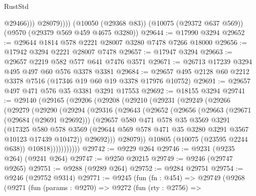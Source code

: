 \begin{lexlean}{RustStd}
\begin{coremodule}
                  @29466)))
            @28079))))
    (@10050 (@29368 @83))
    (@10075 (@29372 @637 @569))
    (@9570 (@29379 @569 @459 @4675 @3280))
@29644 := @17990 @3294
@29652 := @29644 @1814 @578 @2221 @28007 @3280 @7478 @7266 @18000
@29656 := @17942 @3294 @2221 @28007 @7478
@29657 := @17947 @3294
@29663 := @29657 @2219 @582 @577 @641 @7476 @3571
@29671 := @26713 @17239 @3294 @495 @497 @60 @576 @3378 @3381
@29684 := @29657 @495 @2128 @60 @2212 @3378 @7516 (@17346 @19 @60 @19 @3378 @17976 @10752)
@29691 := @29657 @497 @471 @576 @35 @3381 @3291 @17553
@29692 := @18155 @3294
@29741 := @29140
    (@29165
      (@29206
        (@29208
          (@29210
            (@29231
              (@29249
                (@29266
                  (@29279
                    (@29290
                      (@29294
                        (@29316
                          (@29643
                            (@29652
                              (@29656
                                (@29663
                                  (@29671 (@29684 (@29691 @29692)))
                                  (@29657
                                    @580
                                    @471
                                    @578
                                    @35
                                    @3569
                                    @3291
                                    (@17325
                                      @580
                                      @578
                                      @3569
                                      (@29644
                                        @569
                                        @578
                                        @471
                                        @35
                                        @3280
                                        @3291
                                        @3567
                                        @10123
                                        @17439
                                        @10472))
                                    @29692)))
                              @28079))
                          @10805
                          (@10075 (@23595 @2244 @638))
                          @10818)))))))))))
@29742 := @9229 @264
@29746 := @9231 (@9235 @264) (@9241 @264)
@29747 := @9250 @20215
@29749 := @9246 (@29747 @9265)
@29751 := @9288 (@9289 @264)
@29752 := @9284 @29751
@29754 := @9246 (@29752 @9314)
@29771 := @9245
    (fun (fn : @454) =>
    @29749
      (@9268
        (@9271
          (fun (params : @9270) =>
          @9272
            (fun (rty : @2756) =>

\end{coremodule}
\end{lexlean}
